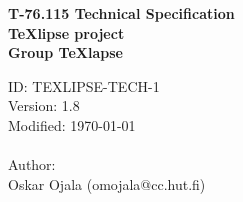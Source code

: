 \documentclass[a4paper,11pt,twoside]{article}
\begin{document}

\begin{titlepage}
\strut
\begin{minipage}{\textwidth}
\LARGE {\bf T-76.115 Technical Specification}\\
\LARGE {\bf \TeX lipse project}\\
\LARGE {\bf Group TeXlapse}
\end{minipage}

\addvspace{2cm}
\begin{minipage}{\textwidth}
\large{ID: TEXLIPSE-TECH-1}\\
\large{Version: 1.8}\\
\large{Modified: \today}\\
\\
\large{Author:\\ Oskar Ojala (omojala@cc.hut.fi)}
\end{minipage}

\end{titlepage}


\clearpage
\end{document}
